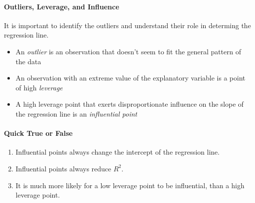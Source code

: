 \documentclass[10pt]{article}\usepackage[]{graphicx}\usepackage[]{color}
\begin{document}
\clearpage
\paragraph{Outliers, Leverage, and Influence}
It is important to identify the outliers and understand their role in determing the regression line.
\vspace{5in}
\begin{itemize}
  \itemsep0in
  \item An \emph{outlier} is an observation that doesn't seem to fit the general pattern of the data
  \item An observation with an extreme value of the explanatory variable is a point of high \emph{leverage}
  \item A high leverage point that exerts disproportionate influence on the slope of the regression line is an \emph{influential point}
\end{itemize}



\paragraph{Quick True or False}

  \begin{enumerate}
\item Influential points always change the intercept of the regression line.
\item Influential points always reduce $R^2$.
\item It is much more likely for a low leverage point to be influential, than a high leverage point.
  \end{enumerate}



% 
% 
% 
\end{document}
